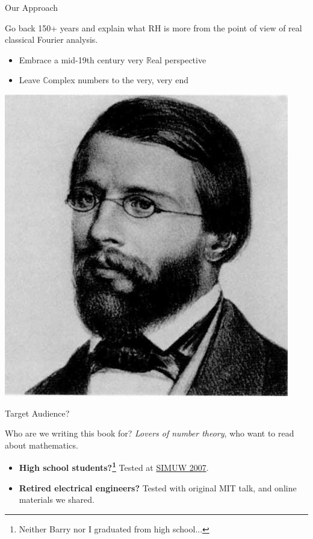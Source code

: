 \documentclass{beamer}
\begin{document}
\begin{frame}{Our Approach}
  \begin{block}{}
    Go back 150+ years and explain what RH is more from the point of view of real classical Fourier analysis.
    \begin{itemize}
      \item Embrace a mid-19th century very $\mathbb{R}$eal perspective
      \item Leave $\mathbb{C}$omplex numbers to the very, very end
    \end{itemize}
  \end{block}
  \begin{center}
    \includegraphics[height=.5\textheight]{pics/riemann}
  \end{center}

\end{frame}


\begin{frame}{Target Audience?}

  \begin{block}{Who are we writing this book for?}
    {\em Lovers of number theory}, who want to read about mathematics.
    \vspace{.5in}

    \begin{itemize}
      \item \textbf{High school students?\footnote{Neither Barry nor I  graduated from high school...}} Tested at \href{https://wstein.org/edu/2007/simuw07/}{SIMUW 2007}.
      \item \textbf{Retired electrical engineers?}  Tested with original MIT talk, and  online materials we shared.
    \end{itemize}
    \vspace{.5in}

  \end{block}

\end{frame}
\end{document}
